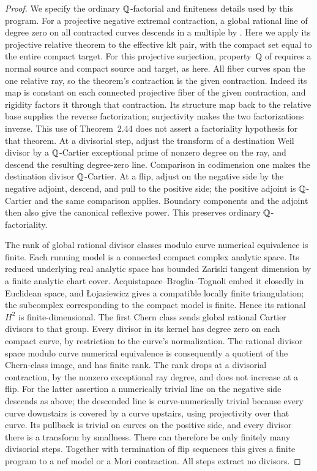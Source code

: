 \begin{proof}
We specify the ordinary \(\mathbb Q\)-factorial and finiteness details used by
this program.  For a projective negative extremal contraction, a global
rational line of degree zero on all contracted curves descends in a
multiple by \cite[Theorem~2.44(3c)]{DasHaconPaun2024}.  Here we apply its
projective relative theorem to the effective klt pair, with the compact
set equal to the entire compact target.  For this projective surjection,
property~Q of \cite[Definition~2.42]{DasHaconPaun2024} requires a normal
source and compact source and target, as here.  All fiber curves span the one relative
ray, so the theorem's contraction is the given contraction.  Indeed its
map is constant on each connected projective fiber of the given contraction,
and rigidity factors it through that contraction.  Its structure map back
to the relative base supplies the reverse factorization; surjectivity makes
the two factorizations inverse.  This use of Theorem~2.44 does
not assert a factoriality hypothesis for that theorem.  At a divisorial step, adjust the
transform of a destination Weil divisor by a \(\mathbb Q\)-Cartier exceptional
prime of nonzero degree on the ray, and descend the resulting degree-zero
line.  Comparison in codimension one makes the destination divisor
\(\mathbb Q\)-Cartier.  At a flip, adjust on the negative side by the negative
adjoint, descend, and pull to the positive side; the positive adjoint is
\(\mathbb Q\)-Cartier and the same comparison applies.  Boundary components
and the adjoint then also give the canonical reflexive power.  This
preserves ordinary \(\mathbb Q\)-factoriality.

The rank of global rational divisor classes modulo curve numerical
equivalence is finite.  Each running model is a connected compact complex
analytic space.  Its reduced underlying real analytic space has bounded
Zariski tangent dimension by a finite analytic chart cover.
Acquistapace--Broglia--Tognoli \cite[Theorem~1]{AcquistapaceBrogliaTognoli1979}
embed it closedly in Euclidean space, and \L{}ojasiewicz
\cite[Theorem~1]{Lojasiewicz1964} gives a compatible locally finite
triangulation; the subcomplex corresponding to the compact model is
finite.  Hence its rational \(H^2\) is finite-dimensional.  The first
Chern class sends global rational Cartier divisors to that group.  Every
divisor in its kernel has degree zero on each compact curve, by restriction
to the curve's normalization.  The rational divisor space modulo curve
numerical equivalence is consequently a quotient of the Chern-class image,
and has finite rank.  The rank drops at a divisorial contraction, by the
nonzero exceptional ray degree, and does not increase at a flip.  For
the latter assertion a numerically trivial line on the negative side
descends as above; the descended line is curve-numerically trivial because
every curve downstairs is covered by a curve upstairs, using projectivity
over that curve.  Its pullback is trivial on curves on the positive side,
and every divisor there is a transform by smallness.  There can therefore
be only finitely many divisorial steps.  Together with termination of flip
sequences this gives a finite program to a nef model or a Mori contraction.
All steps extract no divisors.


\end{proof}
